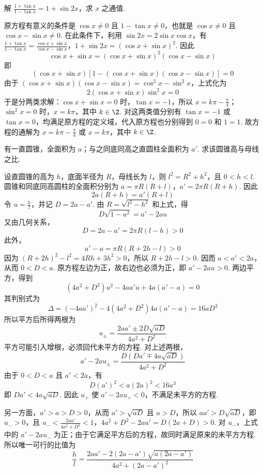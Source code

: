 \begin{problem}
解 \(\frac{1+\tan x}{1-\tan x}=1+\sin 2x\)，求 \(x\) 之通值.
\end{problem}

\begin{solution}
原方程有意义的条件是 \(\cos x\ne0\) 且 \(1-\tan x\ne0\)，也就是 \(\cos x\ne0\) 且 \(\cos x-\sin x\ne0\). 在此条件下，利用 \(\sin 2x=2\sin x\cos x\)，有
\(\frac{1+\tan x}{1-\tan x}=\frac{\cos x+\sin x}{\cos x-\sin x}\)，\(1+\sin 2x=\left(\cos x+\sin x\right)^{2}\).
因此
\[
\cos x+\sin x=\left(\cos x+\sin x\right)^{2}\left(\cos x-\sin x\right)
\]
即
\[
\left(\cos x+\sin x\right)\left[1-\left(\cos x+\sin x\right)\left(\cos x-\sin x\right)\right]=0
\]
由于 \(\left(\cos x+\sin x\right)\left(\cos x-\sin x\right)=\cos^{2}x-\sin^{2}x\)，上式化为
\[
2\left(\cos x+\sin x\right)\sin^{2}x=0
\]
于是分两类求解：\(\cos x+\sin x=0\) 时，\(\tan x=-1\)，所以 \(x=k\pi-\frac{\pi}{4}\)；\(\sin^{2}x=0\) 时，\(x=k\pi\)，其中 \(k\in\Z\). 对这两类值分别有 \(\tan x=-1\) 或 \(\tan x=0\)，均满足原方程的定义域，代入原方程也分别得到 \(0=0\) 和 \(1=1\). 故方程的通解为 \(x=k\pi-\frac{\pi}{4}\) 或 \(x=k\pi\)，其中 \(k\in\Z\).
\end{solution}

\begin{problem}
有一直圆锥，全面积为 \(a\)；与之同底同高之直圆柱全面积为 \(a'\). 求该圆锥高与母线之比.
\end{problem}

\begin{solution}
设直圆锥的高为 \(h\)，底面半径为 \(R\)，母线长为 \(l\)，则 \(l^{2}=R^{2}+h^{2}\)，且 \(0<h<l\). 圆锥和同底同高圆柱的全面积分别为
\(a=\pi R\left(R+l\right)\)，\(a'=2\pi R\left(R+h\right)\).
因此
\[
2a\left(R+h\right)=a'\left(R+l\right)
\]
令 \(u=\frac{h}{l}\)，并记 \(D=2a-a'\). 由 \(R=\sqrt{l^{2}-h^{2}}\) 和上式，得
\[
D\sqrt{1-u^{2}}=a'-2au
\]
又由几何关系，
\[
D=2a-a'=2\pi R(l-h)>0
\]
此外，
\[
a'-a=\pi R\left(R+2h-l\right)>0
\]
因为 \((R+2h)^{2}-l^{2}=4Rh+3h^{2}>0\)，所以 \(R+2h-l>0\). 因而 \(a<a'<2a\)，从而 \(0<D<a\). 原方程左边为正，故右边也必须为正，即 \(a'-2au>0\). 两边平方，得到
\[
\left(4a^{2}+D^{2}\right)u^{2}-4aa'u+4a\left(a'-a\right)=0
\]
其判别式为
\[
\Delta=\left(-4aa'\right)^{2}-4\left(4a^{2}+D^{2}\right)4a\left(a'-a\right)=16aD^{3}
\]
所以平方后所得两根为
\[
u_{\pm}=\frac{2aa'\pm2D\sqrt{aD}}{4a^{2}+D^{2}}
\]
平方可能引入增根，必须回代未平方的方程. 对上述两根，
\[
a'-2au_{\pm}=\frac{D\left(Da'\mp4a\sqrt{aD}\right)}{4a^{2}+D^{2}}
\]
由于 \(0<D<a\) 且 \(a'<2a\)，有
\[
D(a')^{2}<a(2a)^{2}<16a^{3}
\]
即 \(Da'<4a\sqrt{aD}\). 因此 \(u_{+}\) 使 \(a'-2au_{+}<0\)，不满足未平方的方程.

另一方面，\(a'>a>D>0\)，从而 \(a'>\sqrt{aD}\) 且 \(a>D\)，所以 \(aa'>D\sqrt{aD}\)，即 \(u_{-}>0\)，且
\(u_{-}<\frac{2aa'}{4a^{2}+D^{2}}<1\)，\(4a^{2}+D^{2}-2aa'=D(2a+D)>0\).
对 \(u_{-}\)，上式中的 \(a'-2au_{-}\) 为正；由于它满足平方后的方程，故同时满足原来的未平方方程. 所以唯一可行的比值为
\[
\boxed{\frac{h}{l}=\frac{2aa'-2\left(2a-a'\right)\sqrt{a\left(2a-a'\right)}}{4a^{2}+\left(2a-a'\right)^{2}}}
\]
\end{solution}
